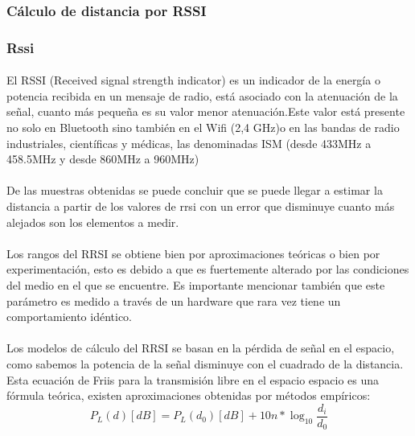 \documentclass[a4paper ,12pt, onecolumn]{article}
\begin{document}
        \subsubsection{Cálculo de distancia por RSSI}
            \subsubsection{Rssi}
                \paragraph{}
                El RSSI (Received signal strength indicator) es un indicador de la energía o potencia recibida en un mensaje de radio, 
                está asociado con la atenuación de la señal, cuanto más pequeña es su valor menor atenuación.Este valor está 
                presente no solo en Bluetooth sino también en el Wifi (2,4 GHz)o en las bandas de radio industriales, científicas y médicas,
                las denominadas ISM (desde 433MHz a 458.5MHz y desde 860MHz a 960MHz)
                \paragraph{}
                De las muestras obtenidas se puede concluir que se puede llegar a estimar la distancia a partir de los valores
                de rrsi con un error que disminuye cuanto más alejados son los elementos a medir. 
                \paragraph{}
                Los rangos del RRSI se obtiene bien por aproximaciones teóricas o bien por experimentación, esto es debido a que 
                es fuertemente alterado por las condiciones del medio en el que se encuentre. Es importante mencionar también que
                este parámetro es medido a través de un hardware que rara vez tiene un comportamiento idéntico.
                \paragraph{}
                Los modelos de cálculo del RRSI se basan en la pérdida de señal en el espacio, como sabemos la potencia de la señal
                disminuye con el cuadrado de la distancia. Esta ecuación de Friis para la transmisión libre en el espacio espacio es 
                una fórmula teórica, existen aproximaciones obtenidas por métodos empíricos:
                \begin{equation}
                    P_L(d) [dB] = P_L(d_0) [dB] + 10n *\log_{10} \frac{ d_i }{d_0} 
                \end{equation}
\end{document}
